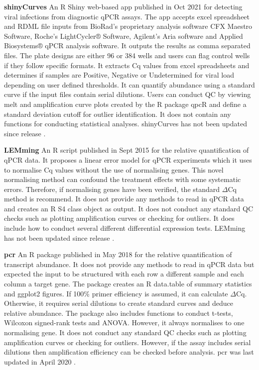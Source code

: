 \documentclass[../main.tex]{subfiles}
\begin{document}
\textbf{shinyCurves} An R Shiny web-based app published in Oct 2021 for detecting viral infections from diagnostic qPCR assays. 
The app accepts excel spreadsheet and RDML file inputs from BioRad's proprietary analysis software CFX Maestro Software, Roche's LightCycler® Software, Agilent's Aria software and Applied Biosystems® qPCR analysis software.
It outputs the results as comma separated files. 
The plate designs are either 96 or 384 wells and users can flag control wells if they follow specific formats. 
It extracts Cq values from excel spreadsheets and determines if samples are Positive, Negative or Undetermined for viral load depending on user defined thresholds. 
It can quantify abundance using a standard curve if the input files contain serial dilutions. 
Users can conduct QC by viewing melt and amplification curve plots created by the R package qpcR and define a standard deviation cutoff for outlier identification.  
It does not contain any functions for conducting statistical analyses. shinyCurves has not been updated since release \parencite{OlaecheaLazaro2021}.

\textbf{LEMming} An R script published in Sept 2015 for the relative quantification of qPCR data. 
It proposes a linear error model for qPCR experiments which it uses to normalise Cq values without the use of normalising genes. 
This novel normalising method can confound the treatment effects with some systematic errors. 
Therefore, if normalising genes have been verified, the standard $\Delta$Cq method is recommend. 
It does not provide any methods to read in qPCR data and creates an R S4 class object as output. 
It does not conduct any standard QC checks such as plotting amplification curves or checking for outliers.  
It does include how to conduct several different differential expression tests. LEMming has not been updated since release \parencite{Feuer2015}.

\textbf{pcr} An R package published in May 2018 for the relative quantification of transcript abundance. 
It does not provide any methods to read in qPCR data but expected the input to be structured with each row a different sample and each column a target gene. 
The package creates an R data.table of summary statistics and ggplot2 figures. 
If 100\% primer efficiency is assumed, it can calculate $\Delta$Cq. 
Otherwise, it requires serial dilutions to create standard curves and deduce relative abundance. 
The package also includes functions to conduct t-tests, Wilcoxon signed-rank tests  and ANOVA.
However, it always normalises to one normalising gene. It does not conduct any standard QC checks such as plotting amplification curves or checking for outliers. 
However, if the assay includes serial dilutions then amplification efficiency can be checked before analysis. 
pcr was last updated in April 2020 \parencite{Ahmed2018}.
\end{document}
